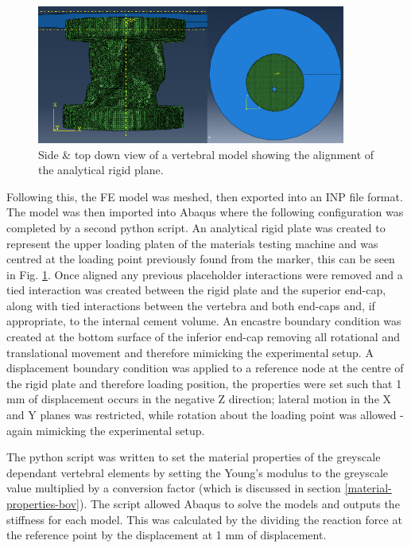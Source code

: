 \begin{figure}[ht!]
\centering

  \includegraphics[width=4in]{images/abaqus_side_view_Both.png}
  \caption{Side \& top down view of a vertebral model showing the alignment of the analytical rigid plane.}
\label{fig:abaqus_top_view}
\end{figure}


Following this, the FE model was meshed, then exported into an INP file format. The model was then imported into Abaqus where the following configuration was completed by a second python script. An analytical rigid plate was created to represent the upper loading platen of the materials testing machine and was centred at the loading point previously found from the marker, this can be seen in Fig. \ref{fig:abaqus_top_view}. Once aligned any previous placeholder interactions were removed and a tied interaction was created between the rigid plate and the superior end-cap, along with tied interactions between the vertebra and both end-caps and, if appropriate, to the internal cement volume. An encastre boundary condition was created at the bottom surface of the inferior end-cap removing all rotational and translational movement and therefore mimicking the experimental setup. A displacement boundary condition was applied to a reference node at the centre of the rigid plate and therefore loading position, the properties were set such that 1 mm of displacement occurs in the negative Z direction; lateral motion in the X and Y planes was restricted, while rotation about the loading point was allowed - again mimicking the experimental setup.

The python script was written to set the material properties of the greyscale dependant vertebral elements by setting the Young's modulus to the greyscale value multiplied by a conversion factor (which is discussed in section \ref{material-properties-bov}). The script allowed Abaqus to solve the models and outputs the stiffness for each model. This was calculated by the dividing the reaction force at the reference point by the displacement at 1 mm of displacement.

